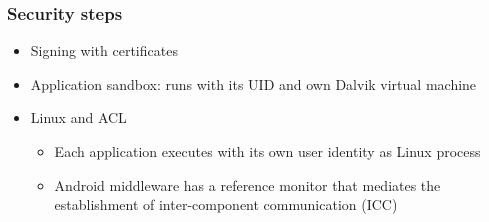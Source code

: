 \documentclass[10pt]{article}
\begin{document}
\subsubsection{Security steps}
\begin{itemize}
	\item Signing with certificates
	\item Application sandbox: runs with its UID and own Dalvik virtual machine
	\item Linux and ACL
	\begin{itemize}
		\item Each application executes with its own user identity as Linux process
		\item Android middleware has a reference monitor that mediates the establishment of inter-component communication (ICC)
	\end{itemize}
\end{itemize}
\end{document}
